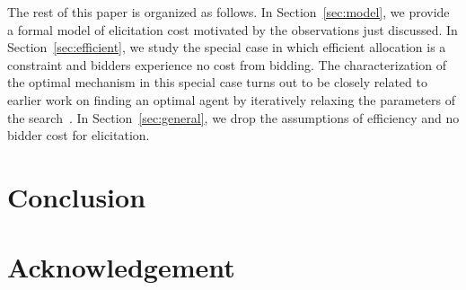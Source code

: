 \documentclass{aamas2013}
\begin{document}
The rest of this paper is organized as follows.  In
Section~\ref{sec:model}, we provide a formal model of elicitation cost
motivated by the observations just discussed.  In
Section~\ref{sec:efficient}, we study the special case in which efficient
allocation is a constraint and bidders experience no cost from bidding.
The characterization of the optimal mechanism in this special case turns
out to be closely related to earlier work on finding an optimal agent by
iteratively relaxing the parameters of the search~\cite{}.  In
Section~\ref{sec:general}, we drop the assumptions of efficiency and no
bidder cost for elicitation.















\section{Conclusion}

\section{Acknowledgement}



\end{document}
